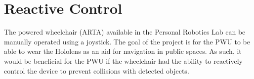 \section{Reactive Control}
The powered wheelchair (ARTA) available in the Personal Robotics Lab can be manually operated using a joystick. The goal of the project is for the PWU to be able to wear the Hololens as an aid for navigation in public spaces. As such, it would be beneficial for the PWU if the wheelchair had the ability to reactively control the device to prevent collisions with detected objects.
